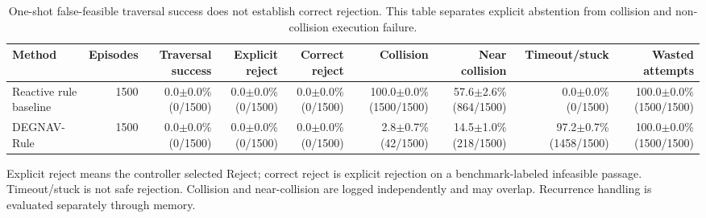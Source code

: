 \begin{table}[t]
\centering
\small
\caption{One-shot false-feasible traversal success does not establish correct rejection. This table separates explicit abstention from collision and non-collision execution failure.}
\label{tab:false-feasible-outcomes}
\begin{tabular}{lrrrrrrrr}
\toprule
Method & Episodes & Traversal success & Explicit reject & Correct reject & Collision & Near collision & Timeout/stuck & Wasted attempts \\
\midrule
Reactive rule baseline & 1500 & 0.0$\pm$0.0\% (0/1500) & 0.0$\pm$0.0\% (0/1500) & 0.0$\pm$0.0\% (0/1500) & 100.0$\pm$0.0\% (1500/1500) & 57.6$\pm$2.6\% (864/1500) & 0.0$\pm$0.0\% (0/1500) & 100.0$\pm$0.0\% (1500/1500) \\
DEGNAV-Rule & 1500 & 0.0$\pm$0.0\% (0/1500) & 0.0$\pm$0.0\% (0/1500) & 0.0$\pm$0.0\% (0/1500) & 2.8$\pm$0.7\% (42/1500) & 14.5$\pm$1.0\% (218/1500) & 97.2$\pm$0.7\% (1458/1500) & 100.0$\pm$0.0\% (1500/1500) \\
\bottomrule
\end{tabular}
\vspace{0.25em}
\begin{minipage}{0.98\linewidth}
\footnotesize Explicit reject means the controller selected Reject; correct reject is explicit rejection on a benchmark-labeled infeasible passage. Timeout/stuck is not safe rejection. Collision and near-collision are logged independently and may overlap. Recurrence handling is evaluated separately through memory.
\end{minipage}
\end{table}
